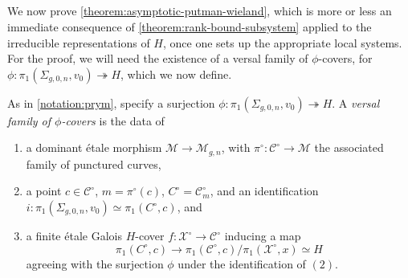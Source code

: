 \subsection{}
	\label{subsection:proof-putman-wieland}

We now prove
\autoref{theorem:asymptotic-putman-wieland}, which
is more or less an immediate consequence of \autoref{theorem:rank-bound-subsystem}
applied to the irreducible representations of $H$,
once one sets up the appropriate local systems.
For the proof, we will need the existence of a versal family of $\phi$-covers,
for $\phi: \pi_1(\Sigma_{g, 0, n}, v_0)\twoheadrightarrow H$,
which we now define.
\begin{definition}
\notready
	\label{definition:}
	As in \autoref{notation:prym}, specify a surjection
	$\phi: \pi_1(\Sigma_{g, 0, n}, v_0)\twoheadrightarrow H$.
	A {\em versal family of $\phi$-covers} is the data of
	\begin{enumerate}
\item a dominant \'etale morphism $\mathscr{M}\to \mathscr{M}_{g,n}$, with $\pi^\circ: \mathscr{C}^\circ\to \mathscr{M}$ the associated family of punctured curves,
\item a point $c\in \mathscr{C}^\circ$, $m=\pi^\circ(c)$, $C^\circ = \mathscr
C^\circ_m$, and an identification $i: \pi_1(\Sigma_{g, 0, n}, v_0)\simeq
\pi_1(C^\circ, c)$, and
\item a finite \'etale Galois $H$-cover $f: \mathscr{X}^\circ\to
	\mathscr{C}^\circ$ inducing a map
	$$\pi_1(C^\circ, c) \to \pi_1(\mathscr{C}^\circ,
	c)/\pi_1(\mathscr{X}^\circ,x) \simeq H$$
	agreeing with the surjection $\phi$ under the
	identification of $(2)$.
\end{enumerate}
\end{definition}

